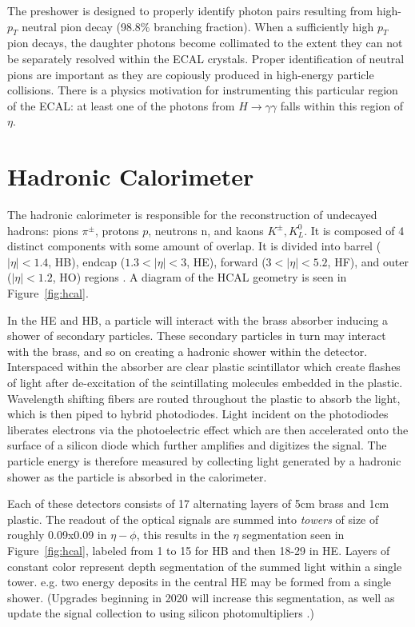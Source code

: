 The preshower is designed to properly identify photon pairs resulting from high-$p_{T}$ neutral pion decay (98.8\% branching fraction). When a sufficiently high $p_{T}$ pion decays, the daughter photons become collimated to the extent they can not be separately resolved within the ECAL crystals. Proper identification of neutral pions are important as they are copiously produced in high-energy particle collisions. There is a physics motivation for instrumenting this particular region of the ECAL: at least one of the photons from $H\rightarrow\gamma\gamma$ falls within this region of $\eta$. 

\section{Hadronic Calorimeter}

The hadronic calorimeter is responsible for the reconstruction of undecayed hadrons: pions $\pi^{\pm}$, protons $p$, neutrons n, and kaons $K^{\pm}, K^{0}_{L}$. It is composed of 4 distinct components with some amount of overlap. It is divided into barrel ($|\eta|<1.4$, HB), endcap ($1.3<|\eta|<3$, HE), forward ($3<|\eta|<5.2$, HF), and outer ($|\eta|<1.2$, HO) regions  \cite{hcaltdr}. A diagram of the HCAL geometry is seen in Figure~\ref{fig:hcal}.

In the HE and HB, a particle will interact with the brass absorber inducing a shower of secondary particles. These secondary particles in turn may interact with the brass, and so on creating a hadronic shower within the detector. Interspaced within the absorber are clear plastic scintillator which create flashes of light after de-excitation of the scintillating molecules embedded in the plastic. Wavelength shifting fibers are routed throughout the plastic to absorb the light, which is then piped to hybrid photodiodes. Light incident on the photodiodes liberates electrons via the photoelectric effect which are then accelerated onto the surface of a silicon diode which further amplifies and digitizes the signal. The particle energy is therefore measured by collecting light generated by a hadronic shower as the particle is absorbed in the calorimeter.

Each of these detectors consists of 17 alternating layers of 5cm brass and 1cm plastic. The readout of the optical signals are summed into \textit{towers} of size of roughly 0.09x0.09 in $\eta-\phi$, this results in the $\eta$ segmentation seen in Figure~\ref{fig:hcal}, labeled from 1 to 15 for HB and then 18-29 in HE.  Layers of constant color represent depth segmentation of the summed light within a single tower.  e.g. two energy deposits in the central HE may be formed from a single shower. (Upgrades beginning in 2020 will increase this segmentation, as well as update the signal collection to using silicon photomultipliers  \cite{hcalupgrade}.)

